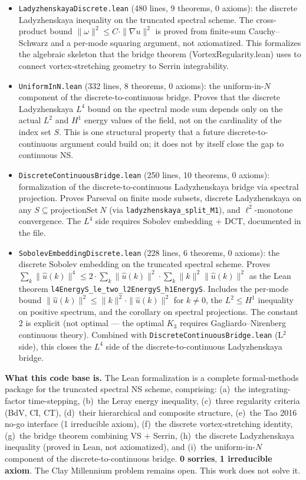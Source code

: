 \documentclass[11pt]{article}
\begin{document}
\begin{itemize}
\item \texttt{LadyzhenskayaDiscrete.lean} (480 lines, 9 theorems, 0 axioms):
  the discrete Ladyzhenskaya inequality on the truncated spectral
  scheme. The cross-product bound $\|\omega\|^2 \le C \cdot \|\nabla u\|^2$
  is proved from finite-sum Cauchy--Schwarz and a per-mode squaring
  argument, not axiomatized. This formalizes the algebraic skeleton that
  the bridge theorem (VortexRegularity.lean) uses to connect
  vortex-stretching geometry to Serrin integrability.
\item \texttt{UniformInN.lean} (332 lines, 8 theorems, 0 axioms): the
  uniform-in-$N$ component of the discrete-to-continuous bridge. Proves
  that the discrete Ladyzhenskaya $L^4$ bound on the spectral mode
  sum depends only on the actual $L^2$ and $H^1$ energy values of the
  field, not on the cardinality of the index set $S$. This is one
  structural property that a future discrete-to-continuous argument
  could build on; it does not by itself close the gap to continuous NS.
\item \texttt{DiscreteContinuousBridge.lean} (250 lines, 10 theorems, 0 axioms):
  formalization of the discrete-to-continuous Ladyzhenskaya bridge via
  spectral projection. Proves Parseval on finite mode subsets, discrete
  Ladyzhenskaya on any $S \subseteq \mathrm{projectionSet}\ N$ (via
  \texttt{ladyzhenskaya\_split\_M1}), and $\ell^2$-monotone convergence.
  The $L^4$ side requires Sobolev embedding + DCT, documented in the file.
\item \texttt{SobolevEmbeddingDiscrete.lean} (228 lines, 6 theorems, 0 axioms):
  the discrete Sobolev embedding on the truncated spectral scheme. Proves
  $\sum_k \|\hat u(k)\|^4 \le 2 \cdot \sum_k \|\hat u(k)\|^2 \cdot
   \sum_k \|k\|^2 \|\hat u(k)\|^2$ as the Lean theorem
  \texttt{l4EnergyS\_le\_two\_l2EnergyS\_h1EnergyS}. Includes the per-mode
  bound $\|\hat u(k)\|^2 \le \|k\|^2 \cdot \|\hat u(k)\|^2$ for $k \ne 0$,
  the $L^2 \le H^1$ inequality on positive spectrum, and the corollary on
  spectral projections. The constant $2$ is explicit (not optimal --- the
  optimal $K_3$ requires Gagliardo--Nirenberg continuous theory). Combined
  with \texttt{DiscreteContinuousBridge.lean} (L$^2$ side), this closes
  the $L^4$ side of the discrete-to-continuous Ladyzhenskaya bridge.
\end{itemize}

\textbf{What this code base is.} The Lean formalization is a complete
formal-methods package for the truncated spectral NS scheme, comprising:
(a)~the integrating-factor time-stepping, (b)~the Leray energy
inequality, (c)~three regularity criteria (BdV, CI, CT), (d)~their
hierarchical and composite structure, (e)~the Tao 2016 no-go interface
(1 irreducible axiom), (f)~the discrete vortex-stretching identity,
(g)~the bridge theorem combining VS + Serrin, (h)~the discrete
Ladyzhenskaya inequality (proved in Lean, not axiomatized), and
(i)~the uniform-in-$N$ component of the discrete-to-continuous
bridge. \textbf{0 sorries}, \textbf{1 irreducible axiom}. The Clay
Millennium problem remains open. This work does not solve it.
\end{document}
